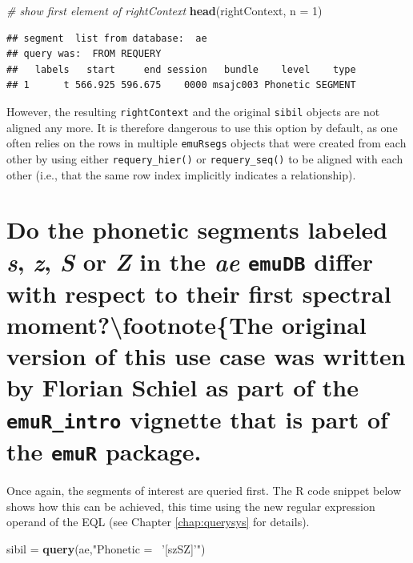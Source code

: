 \documentclass[]{book}
\newenvironment{Shaded}{\begin{snugshade}}{\end{snugshade}}
\newcommand{\CommentTok}[1]{\textcolor[rgb]{0.56,0.35,0.01}{\textit{#1}}}
\newcommand{\DataTypeTok}[1]{\textcolor[rgb]{0.13,0.29,0.53}{#1}}
\newcommand{\DecValTok}[1]{\textcolor[rgb]{0.00,0.00,0.81}{#1}}
\newcommand{\KeywordTok}[1]{\textcolor[rgb]{0.13,0.29,0.53}{\textbf{#1}}}
\newcommand{\NormalTok}[1]{#1}
\newcommand{\StringTok}[1]{\textcolor[rgb]{0.31,0.60,0.02}{#1}}
\theoremstyle{definition}
\theoremstyle{definition}
\theoremstyle{definition}
\theoremstyle{remark}
\begin{document}
\begin{Shaded}
\begin{Highlighting}[]
\CommentTok{# show first element of rightContext}
\KeywordTok{head}\NormalTok{(rightContext, }\DataTypeTok{n =} \DecValTok{1}\NormalTok{)}
\end{Highlighting}
\end{Shaded}

\begin{verbatim}
## segment  list from database:  ae 
## query was:  FROM REQUERY 
##   labels   start     end session   bundle    level    type
## 1      t 566.925 596.675    0000 msajc003 Phonetic SEGMENT
\end{verbatim}

However, the resulting \texttt{rightContext} and the original
\texttt{sibil} objects are not aligned any more. It is therefore
dangerous to use this option by default, as one often relies on the rows
in multiple \texttt{emuRsegs} objects that were created from each other
by using either \texttt{requery\_hier()} or \texttt{requery\_seq()} to
be aligned with each other (i.e., that the same row index implicitly
indicates a relationship).

\hypertarget{sec:app-chap-useCases-q4}{%
\section{\texorpdfstring{Do the phonetic segments labeled \emph{s},
\emph{z}, \emph{S} or \emph{Z} in the \emph{ae} \texttt{emuDB} differ
with respect to their first spectral
moment?\protect\textbackslash{}footnote\{The original version of this
use case was written by Florian Schiel as part of the
\texttt{emuR\_intro} vignette that is part of the \texttt{emuR}
package.}{Do the phonetic segments labeled s, z, S or Z in the ae emuDB differ with respect to their first spectral moment?\textbackslash{}footnote\{The original version of this use case was written by Florian Schiel as part of the emuR\_intro vignette that is part of the emuR package.}}\label{sec:app-chap-useCases-q4}}

Once again, the segments of interest are queried first. The R code
snippet below shows how this can be achieved, this time using the new
regular expression operand of the EQL (see Chapter \ref{chap:querysys}
for details).

\begin{Shaded}
\begin{Highlighting}[]
\NormalTok{sibil =}\StringTok{ }\KeywordTok{query}\NormalTok{(ae,}\StringTok{"Phonetic =~ '[szSZ]'"}\NormalTok{)}
\end{Highlighting}
\end{Shaded}
\end{document}
